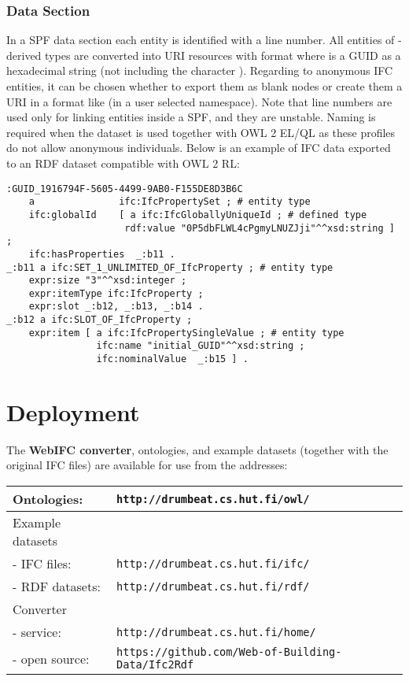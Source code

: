 \subsubsection{Data Section} In a SPF data section each entity is identified with a line number.
All entities of -derived types are converted into URI resources with format  where  is a GUID as a hexadecimal string (not including the character \name{\$}). Regarding to anonymous IFC entities, it can be chosen whether to export them as blank nodes or create them a URI in a format like  (in a user selected namespace). Note that line numbers are used only for linking entities inside a SPF, and they are unstable. Naming is required when the dataset is used together with OWL 2 EL/QL as these profiles do not allow anonymous individuals. Below is an example of IFC data exported to an RDF dataset compatible with OWL 2 RL:

\begin{lstlisting}
:GUID_1916794F-5605-4499-9AB0-F155DE8D3B6C
    a               ifc:IfcPropertySet ; # entity type
    ifc:globalId    [ a ifc:IfcGloballyUniqueId ; # defined type
                     rdf:value "0P5dbFLWL4cPgmyLNUZJji"^^xsd:string ] ;
    ifc:hasProperties  _:b11 .
_:b11 a ifc:SET_1_UNLIMITED_OF_IfcProperty ; # entity type
    expr:size "3"^^xsd:integer ;
    expr:itemType ifc:IfcProperty ;
    expr:slot _:b12, _:b13, _:b14 .
_:b12 a ifc:SLOT_OF_IfcProperty ;
    expr:item [ a ifc:IfcPropertySingleValue ; # entity type
                ifc:name "initial_GUID"^^xsd:string ;
                ifc:nominalValue  _:b15 ] .
\end{lstlisting}



\section{Deployment}

The \textbf{WebIFC converter}, \ifcowl{} ontologies, and example \ifcrdf{} datasets (together with the original IFC files) are available for use from the addresses:

\vspace{2mm}
\begin{tabular}{|l|l|}
\hline
Ontologies: & \texttt{http://drumbeat.cs.hut.fi/owl/} \\
\hline
Example datasets & \\
- IFC files: & \texttt{http://drumbeat.cs.hut.fi/ifc/} \\
- RDF datasets: & \texttt{http://drumbeat.cs.hut.fi/rdf/} \\
\hline
Converter & \\
- service: & \texttt{http://drumbeat.cs.hut.fi/home/} \\
- open source: & \texttt{https://github.com/Web-of-Building-Data/Ifc2Rdf} \\
\hline
\end{tabular}


